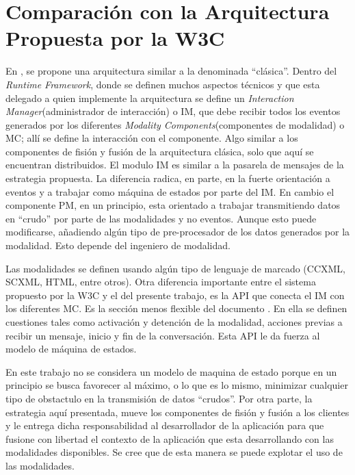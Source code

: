 \section{Comparación con la Arquitectura Propuesta por la W3C} \label{sec:arq_others_w3c}
En \citet{w3c:mmiarch}, se propone una arquitectura similar a la denominada ``clásica''. Dentro del \emph{Runtime Framework}, donde se definen muchos aspectos técnicos y que esta delegado a quien implemente la arquitectura se define un \emph{Interaction Manager}(administrador de interacción) o IM, que debe recibir todos los eventos generados por los diferentes \emph{Modality Components}(componentes de modalidad) o MC; allí se define la interacción con el componente. Algo similar a los componentes de fisión y fusión de la arquitectura clásica, solo que aquí se encuentran distribuidos. El modulo IM es similar a la pasarela de mensajes de la estrategia propuesta. La diferencia radica, en parte, en la fuerte orientación a eventos y a trabajar como máquina de estados por parte del IM. En cambio el componente PM, en un principio, esta orientado a trabajar transmitiendo datos en ``crudo'' por parte de las modalidades y no eventos. Aunque esto puede modificarse, añadiendo algún tipo de pre-procesador de los datos generados por la modalidad. Esto depende del ingeniero de modalidad.

Las modalidades se definen usando algún tipo de lenguaje de marcado (\ie CCXML, SCXML, HTML, entre otros). Otra diferencia importante entre el sistema propuesto por la W3C y el del presente trabajo, es la API que conecta el IM con los diferentes MC. Es la sección menos flexible del documento \citet{w3c:mmiarch}. En ella se definen cuestiones tales como activación y detención de la modalidad, acciones previas a recibir un mensaje, inicio y fin de la conversación. Esta API le da fuerza al modelo de máquina de estados. 

En este trabajo no se considera un modelo de maquina de estado porque en un principio se busca favorecer al máximo, o lo que es lo mismo, minimizar cualquier tipo de obstactulo en la transmisión de datos ``crudos''. Por otra parte, la estrategia aquí presentada, mueve los componentes de fisión y fusión a los clientes y le entrega dicha responsabilidad al desarrollador de la aplicación para que fusione con libertad el contexto de la aplicación que esta desarrollando con las modalidades disponibles. Se cree que de esta manera se puede explotar el uso de las modalidades.

